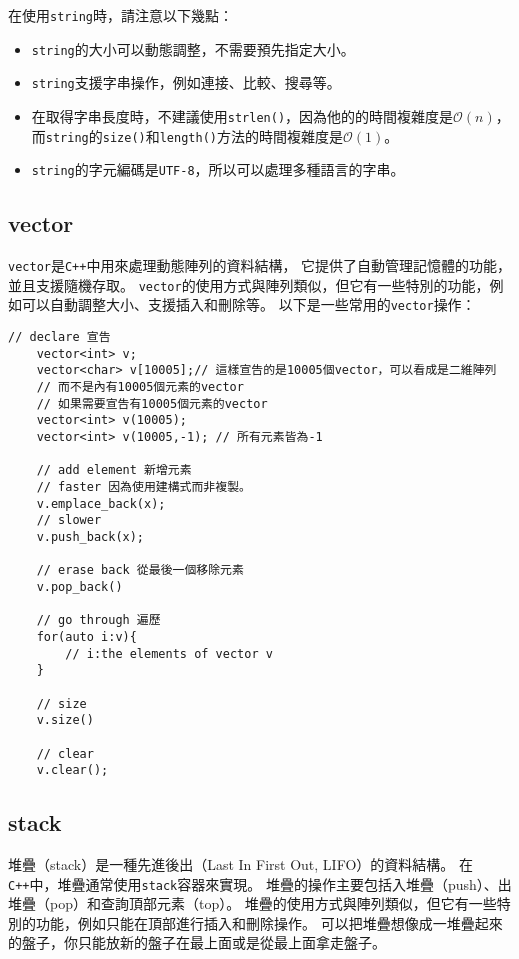     在使用\texttt{string}時，請注意以下幾點：
    \begin{itemize}
        \item \texttt{string}的大小可以動態調整，不需要預先指定大小。
        \item \texttt{string}支援字串操作，例如連接、比較、搜尋等。
        \item 在取得字串長度時，不建議使用\texttt{strlen()}，因為他的的時間複雜度是\(\mathcal{O}(n)\)，
        而\texttt{string}的\texttt{size()}和\texttt{length()}方法的時間複雜度是\(\mathcal{O}(1)\)。
        \item \texttt{string}的字元編碼是\texttt{UTF-8}，所以可以處理多種語言的字串。
    \end{itemize}
    \subsection{vector}

    \texttt{vector}是\texttt{C++}中用來處理動態陣列的資料結構，
    它提供了自動管理記憶體的功能，並且支援隨機存取。
    \texttt{vector}的使用方式與陣列類似，但它有一些特別的功能，例如可以自動調整大小、支援插入和刪除等。
    \newpage
    以下是一些常用的\texttt{vector}操作：
    \begin{lstlisting}[caption=vector 用法]
    // declare 宣告
    vector<int> v;
    vector<char> v[10005];// 這樣宣告的是10005個vector，可以看成是二維陣列
    // 而不是內有10005個元素的vector
    // 如果需要宣告有10005個元素的vector
    vector<int> v(10005);
    vector<int> v(10005,-1); // 所有元素皆為-1

    // add element 新增元素
    // faster 因為使用建構式而非複製。
    v.emplace_back(x);
    // slower
    v.push_back(x);

    // erase back 從最後一個移除元素
    v.pop_back()

    // go through 遍歷
    for(auto i:v){
        // i:the elements of vector v
    }

    // size
    v.size()
        
    // clear
    v.clear();
    \end{lstlisting}

    \subsection{stack}
    堆疊（stack）是一種先進後出（Last In First Out, LIFO）的資料結構。
    在\texttt{C++}中，堆疊通常使用\texttt{stack}容器來實現。
    堆疊的操作主要包括入堆疊（push）、出堆疊（pop）和查詢頂部元素（top）。
    堆疊的使用方式與陣列類似，但它有一些特別的功能，例如只能在頂部進行插入和刪除操作。
    可以把堆疊想像成一堆疊起來的盤子，你只能放新的盤子在最上面或是從最上面拿走盤子。

